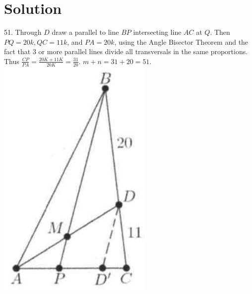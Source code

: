 \documentclass{article}
\begin{document}
\section*{Solution}
51.
Through \(D\) draw a parallel to line \(B P\) intersecting line \(A C\) at \(Q\). Then \(P Q=20 k, Q C=11 k\), and \(P A=20 k\), using the Angle Bisector Theorem and the fact that 3 or more parallel lines divide all transversals in the same proportions. Thus \(\frac{C P}{P A}=\frac{20 K+11 K}{20 K}=\frac{31}{20}\). \(m+n=31+20=51\).\\
\centering
\includegraphics[width=\textwidth]{images/reasoning_image_1.jpg}
\end{document}
